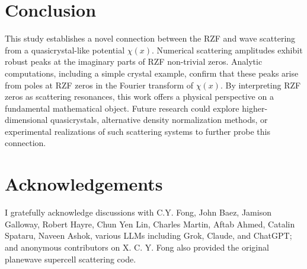 \documentclass[11pt, oneside]{article}
\begin{document}
\section{Conclusion}

This study establishes a novel connection between the RZF and wave scattering from a quasicrystal-like potential $\chi(x)$. Numerical scattering amplitudes exhibit robust peaks at the imaginary parts of RZF non-trivial zeros. Analytic computations, including a simple crystal example, confirm that these peaks arise from poles at RZF zeros in the Fourier transform of $\chi(x)$. By interpreting RZF zeros as scattering resonances, this work offers a physical perspective on a fundamental mathematical object. Future research could explore higher-dimensional quasicrystals, alternative density normalization methods, or experimental realizations of such scattering systems to further probe this connection.

\section{Acknowledgements}
I gratefully acknowledge discussions with C.Y. Fong, John Baez, Jamison Galloway, Robert Hayre, Chun Yen Lin, Charles Martin, Aftab Ahmed, Catalin Spataru, Naveen Ashok, various LLMs including Grok, Claude, and ChatGPT; and anonymous contributors on X. C. Y. Fong also provided the original planewave supercell scattering code.

\printbibliography
\end{document}
